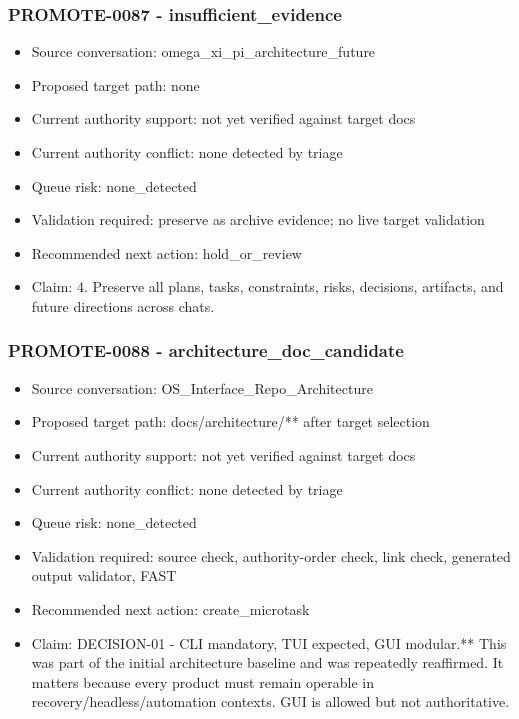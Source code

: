 \documentclass[11pt,a4paper]{report}
\begin{document}
\subsubsection{PROMOTE-0087 - insufficient\_evidence}

\begin{itemize}
\item Source conversation: omega\_xi\_pi\_architecture\_future
\item Proposed target path: none
\item Current authority support: not yet verified against target docs
\item Current authority conflict: none detected by triage
\item Queue risk: none\_detected
\item Validation required: preserve as archive evidence; no live target validation
\item Recommended next action: hold\_or\_review
\item Claim: 4. Preserve all plans, tasks, constraints, risks, decisions, artifacts, and future directions across chats.
\end{itemize}

\subsubsection{PROMOTE-0088 - architecture\_doc\_candidate}

\begin{itemize}
\item Source conversation: OS\_Interface\_Repo\_Architecture
\item Proposed target path: docs/architecture/** after target selection
\item Current authority support: not yet verified against target docs
\item Current authority conflict: none detected by triage
\item Queue risk: none\_detected
\item Validation required: source check, authority-order check, link check, generated output validator, FAST
\item Recommended next action: create\_microtask
\item Claim: DECISION-01 - CLI mandatory, TUI expected, GUI modular.** This was part of the initial architecture baseline and was repeatedly reaffirmed. It matters because every product must remain operable in recovery/headless/automation contexts. GUI is allowed but not authoritative.
\end{itemize}
\end{document}

